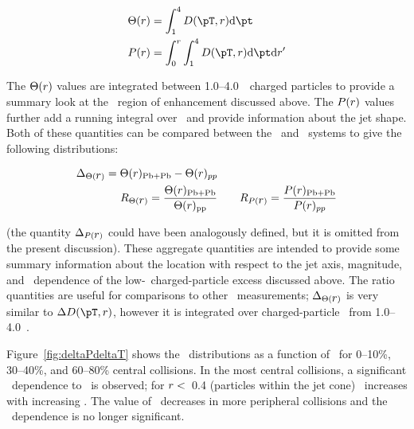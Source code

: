 \begin{align}
   \Theta(\rvar) &= \int_1^{4} \Dptr  \fd \pt \\
   P(\rvar) &= \int_0^r \int_1^{4} \Dptr \fd \pt \fd r'
\end{align}

The $\Theta(\mbox{$r$})$ values are integrated between 1.0--4.0~\GeV\ charged particles to provide a summary look at
the \pt\ region of enhancement discussed above.  The $P(\mbox{$r$})$ values further add a running integral over \rvar\
and provide information about the jet shape.
Both of these quantities can be compared between the \pp\ and \pbpb\ systems to give the following distributions:

\begin{align}
   \Delta_{\Theta(\mbox{$r$})} = \Theta(\mbox{$r$})_{\mathrm{Pb+Pb}} - \Theta(\mbox{$r$})_{pp} & \\
   R_{\Theta(\mbox{$r$})} = \frac{\Theta(\mbox{$r$})_{\mathrm{Pb+Pb}}}{\Theta(\mbox{$r$})_{\mathrm{pp}}} &  \qquad R_{P(\mbox{$r$})} = \frac{P(\mbox{$r$})_{\mathrm{Pb+Pb}}}{P(\mbox{$r$})_{pp}}
\end{align}

(the quantity $\Delta_{P(\mbox{$r$})}$ could have been analogously  defined, but it is omitted from the present discussion).
These aggregate quantities are intended to provide some summary information about the location with respect to the 
jet axis, magnitude, and \ptjet\ dependence of the low-\pt\ charged-particle excess discussed above.
The ratio quantities are useful for comparisons to other \pbpb\ measurements; $\Delta_{\Theta(\mbox{$r$})}$ is very similar 
to $\DeltaDptr$, however it is integrated over charged-particle \pt\ from 1.0--4.0~\GeV.

Figure~\ref{fig:deltaPdeltaT} shows the \DeltaTheta\ distributions as a function of \rvar\ for 0--10\%, 30--40\%,
and 60--80\% central collisions. 
In the most central collisions, a significant \ptjet\ dependence to \DeltaTheta\ is observed; for $\mbox{$r$} <$~0.4 (particles
within the jet cone) \DeltaTheta\ increases with increasing \ptjet.
The value of \DeltaTheta\ decreases in more peripheral collisions and the \ptjet\ dependence is no longer significant.


